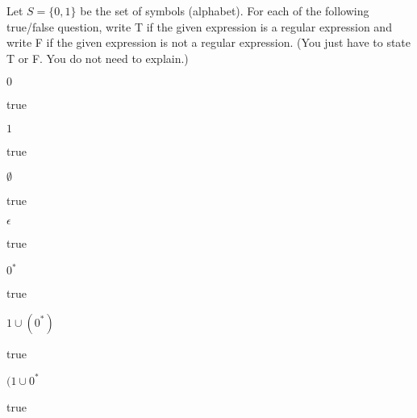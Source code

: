 

\renewcommand\AUTHOR{nweadick1@cougars.ccis.edu} %


\topmattertwo


Let $S = \{0, 1\}$ be the set of symbols (alphabet).
For each of the following true/false question, write T if the given
expression is a regular expression and write F if the given expression is not
a regular expression.
(You just have to state T or F. You do not need to explain.)

\nextq
$0$
\\
\ANSWER
\begin{answerlong}
true
\end{answerlong}

\nextq
$1$
\\
\ANSWER
\begin{answerlong}
true
\end{answerlong}

\nextq
$\emptyset$
\\
\ANSWER
\begin{answerlong}
true
\end{answerlong}

\nextq
$\epsilon$
\\
\ANSWER
\begin{answerlong}
true
\end{answerlong}

\nextq
$0^*$
\\
\ANSWER
\begin{answerlong}
true
\end{answerlong}

\nextq
$1 \cup (0^*)$
\\
\ANSWER
\begin{answerlong}
true
\end{answerlong}

\nextq
$(1 \cup 0^*$
\\
\ANSWER
\begin{answerlong}
true
\end{answerlong}

